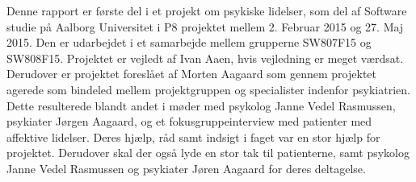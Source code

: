 Denne rapport er første del i et projekt om psykiske lidelser, som del af Software studie på Aalborg Universitet i P8 projektet mellem 2. Februar 2015 og 27. Maj 2015. 
Den er udarbejdet i et samarbejde mellem grupperne SW807F15 og SW808F15.
Projektet er vejledt af Ivan Aaen, hvis vejledning er meget værdsat.
Derudover er projektet foreslået af Morten Aagaard som gennem projektet agerede som bindeled mellem projektgruppen og specialister indenfor psykiatrien. Dette resulterede blandt andet i møder med psykolog Janne Vedel Rasmussen, psykiater Jørgen Aagaard, og et fokusgruppeinterview med patienter med affektive lidelser. Deres hjælp, råd samt indsigt i faget var en stor hjælp for projektet.
Derudover skal der også lyde en stor tak til patienterne, samt psykolog Janne Vedel Rasmussen og psykiater Jøren Aagaard for deres deltagelse.